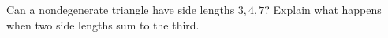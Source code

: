Can a nondegenerate triangle have side lengths $ 3,4,7 $? Explain what happens when two side lengths sum to the third.
